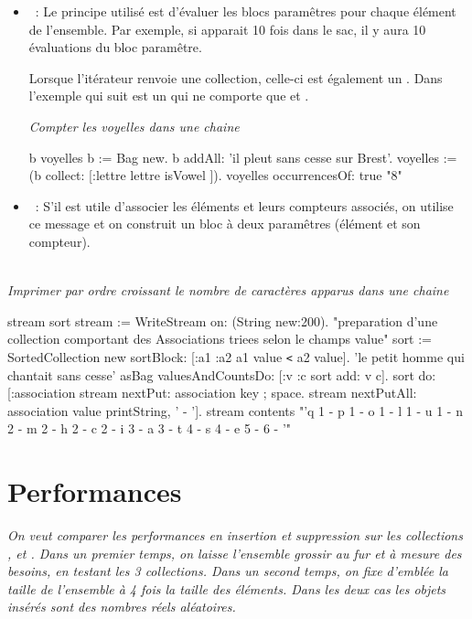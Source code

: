 \begin{itemize}

\item {}~:
Le principe utilis\'e est d'\'evaluer les blocs param\^etres pour chaque \'el\'ement
de l'ensemble. Par exemple, si  apparait 10 fois dans le sac, il
y aura 10 \'evaluations du bloc param\^etre.

Lorsque l'it\'erateur renvoie une collection, celle-ci est \'egalement un .
Dans l'exemple qui suit  est un  qui ne comporte que 
 et .

{\em Compter les voyelles dans une chaine}
\begin{scode}
\stBar b voyelles \stBar
    b := Bag new.
    b addAll: 'il pleut sans cesse sur Brest'.
    voyelles := (b collect: [:lettre \stBar lettre isVowel ]).
    voyelles occurrencesOf: true 
    "8"
\end{scode}

\item {}~: S'il est utile d'associer les \'el\'ements
et leurs compteurs associ\'es, on utilise ce message et on construit un bloc
\`a deux param\^etres (\'el\'ement et son compteur).


\end{itemize}
~\\{\em Imprimer par ordre croissant le nombre de caract\`eres apparus dans une chaine}
\begin{scode}

\stBar stream sort \stBar
stream := WriteStream on: (String new:200).
"preparation d'une collection comportant des Associations triees selon le champs value"
sort := SortedCollection new sortBlock: [:a1 :a2 \stBar a1 value \texttt{<} a2 value].
'le petit homme qui chantait sans cesse' asBag valuesAndCountsDo: [:v :c \stBar sort add: v\assoc{} c].
sort do: [:association \stBar stream nextPut: association key ; space.
     stream nextPutAll: association value printString, ' - '].
     stream contents 
"'q 1 - p 1 - o 1 - l 1 - u 1 - n 2 - m 2 - h 2 - c 2 - 
  i 3 - a 3 - t 4 - s 4 - e 5 -   6 - '"
\end{scode}




\section{Performances}
 \label{sec:perf}
{\em On veut comparer les performances en insertion et suppression sur les collections
,  et . Dans un premier temps, on laisse l'ensemble grossir au fur et \`a mesure des besoins, en testant les 3 collections.
Dans un second temps,  on fixe d'embl\'ee la taille de l'ensemble \`a 4 fois
la taille des \'el\'ements. Dans les deux cas les objets ins\'er\'es sont des nombres r\'eels al\'eatoires. }

